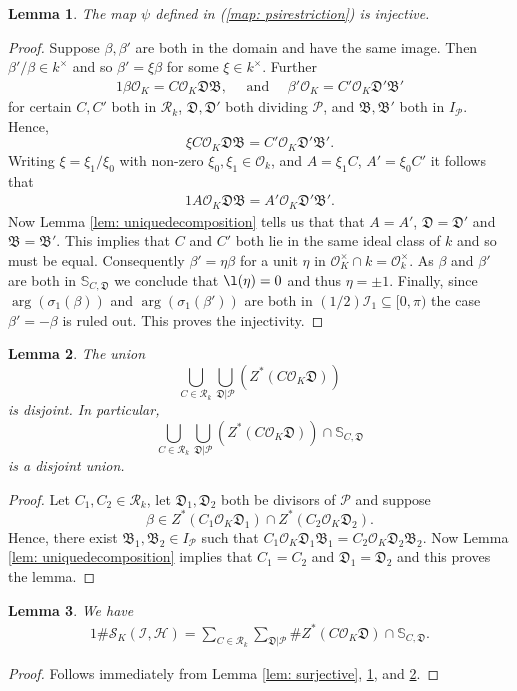\documentclass[11pt]{amsart}
\newtheorem{lemma}{Lemma}[section]
\numberwithin{equation}{eqncounter}
\def\IS{\mathbb S}
\def\Pc{\mathcal{P}}
\def\H{\mathcal{H}}
\def\I{\mathcal{I}}
\def\R{\mathcal{R}}
\def\B{\mathfrak{B}}
\def\D{\mathfrak{D}}
\def\Zstar{Z^*}
\def\Oseen{{\mathcal{O}}}
\def\Sc{\mathcal{S}}
\begin{document}
\begin{lemma}\label{lem: injective}
The map $\psi$ defined in (\ref{map: psirestriction}) is injective.
\end{lemma}
\begin{proof}
Suppose $\beta,\beta'$ are both in the domain and have the same image. Then $\beta'/\beta\in k^\times$ and so $\beta'=\xi\beta$ for some $\xi \in k^\times$.
Further 
\begin{alignat*}1
\beta\Oseen_K=C\Oseen_K \D\B, \quad \text{ and } \quad 
\beta'\Oseen_K=C'\Oseen_K \D'\B'
\end{alignat*}
for certain $C,C'$ both in $\R_k$, $\D,\D'$ both dividing $\Pc$, and $\B,\B'$ both in $I_\Pc$.
Hence, 
$$\xi C\Oseen_K \D\B=C'\Oseen_K \D'\B'.$$
Writing $\xi=\xi_1/\xi_0$ with non-zero  $\xi_0,\xi_1\in \Oseen_k$, and $A=\xi_1 C$, $A'=\xi_0 C'$ it follows that
\begin{alignat*}1
A\Oseen_K\D\B=A'\Oseen_K\D'\B'.
\end{alignat*}
Now
Lemma \ref{lem: uniquedecomposition} tells us that
that $A=A'$, $\D=\D'$ and $\B=\B'$. This implies that $C$ and $C'$ both lie in the same ideal class of $k$ and so must be equal.
Consequently $\beta'=\eta \beta$ for a unit $\eta$ in $\Oseen_K^\times\cap k=\Oseen_k^\times$.  As $\beta$ and $\beta'$ are both in $ \IS_{C,\D}$ we 
conclude that $\l(\eta)=0$ and thus $\eta=\pm 1$. Finally, since $\arg(\sigma_1(\beta))$ and $\arg(\sigma_1(\beta'))$ are both in $(1/2)\I_1\subseteq [0,\pi)$ 
the case $\beta'=-\beta$ is ruled out. This proves the injectivity. 
\end{proof}


\begin{lemma}\label{lem: disjoint}
The union
$$\bigcup_{C\in \R_k}\bigcup_{\D|\Pc}(\Zstar(C\Oseen_K\D))$$
is disjoint.
In particular, 
$$\bigcup_{C\in \R_k}\bigcup_{\D|\Pc}(\Zstar(C\Oseen_K\D))\cap \IS_{C,\D}$$
is a disjoint union.
\end{lemma}
\begin{proof}
Let $C_1,C_2\in \R_k$, let $\D_1,\D_2$ both be divisors of $\Pc$ and suppose 
$$\beta\in \Zstar(C_1\Oseen_K\D_1)\cap \Zstar(C_2\Oseen_K\D_2).$$ 
Hence, 
there exist $\B_1,\B_2\in I_\Pc$ such that
$C_1\Oseen_K\D_1\B_1=C_2\Oseen_K\D_2\B_2$. 
Now Lemma \ref{lem: uniquedecomposition} implies that 
$C_1=C_2$ and $\D_1=\D_2$ and this proves the lemma.
\end{proof}




\begin{lemma}\label{lem: SKcount}
We have 
\begin{alignat*}1
\#\Sc_K(\I,\H)=\sum_{C\in \R_k}\sum_{\D|\Pc}\#\Zstar(C\Oseen_K\D)\cap \IS_{C,\D}.
\end{alignat*}
\end{lemma}
\begin{proof}
Follows immediately from Lemma \ref{lem: surjective}, \ref{lem: injective}, and \ref{lem: disjoint}.
\end{proof}
 
\end{document}
